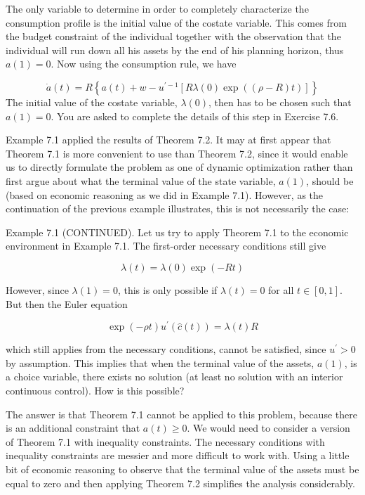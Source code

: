 \documentclass[\topdir/lecture_notes.tex]{subfiles}
\begin{document}
The only variable to determine in order to completely characterize the consumption profile is the initial value of the costate variable. This comes from the budget constraint of the individual together with the observation that the individual will run down all his assets by the end of his planning horizon, thus $a(1)=0$. Now using the consumption rule, we have

\[
\dot{a}(t)=R\left\{a(t)+w-u^{\prime-1}[R \lambda(0) \exp ((\rho-R) t)]\right\}
\]
The initial value of the costate variable, $\lambda(0)$, then has to be chosen such that $a(1)=0$. You are asked to complete the details of this step in Exercise 7.6.

Example 7.1 applied the results of Theorem 7.2. It may at first appear that Theorem 7.1 is more convenient to use than Theorem 7.2, since it would enable us to directly formulate the problem as one of dynamic optimization rather than first argue about what the terminal value of the state variable, $a(1)$, should be (based on economic reasoning as we did in Example 7.1). However, as the continuation of the previous example illustrates, this is not necessarily the case:

Example 7.1 (CONTINUED). Let us try to apply Theorem 7.1 to the economic environment in Example 7.1. The first-order necessary conditions still give

\[
\lambda(t)=\lambda(0) \exp (-R t)
\]

However, since $\lambda(1)=0$, this is only possible if $\lambda(t)=0$ for all $t \in[0,1]$. But then the Euler equation

\[
\exp (-\rho t) u^{\prime}(\hat{c}(t))=\lambda(t) R
\]

which still applies from the necessary conditions, cannot be satisfied, since $u^{\prime}>0$ by assumption. This implies that when the terminal value of the assets, $a(1)$, is a choice variable, there exists no solution (at least no solution with an interior continuous control). How is this possible?

The answer is that Theorem 7.1 cannot be applied to this problem, because there is an additional constraint that $a(t) \geq 0$. We would need to consider a version of Theorem 7.1 with inequality constraints. The necessary conditions with inequality constraints are messier and more difficult to work with. Using a little bit of economic reasoning to observe that the terminal value of the assets must be equal to zero and then applying Theorem 7.2 simplifies the analysis considerably.
\end{document}
